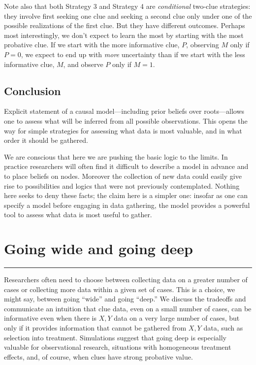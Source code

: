 \documentclass[
  12pt,
]{book}
\begin{document}
Note also that both Strategy 3 and Strategy 4 are \emph{conditional} two-clue strategies: they involve first seeking one clue and seeking a second clue only under one of the possible realizations of the first clue. But they have different outcomes. Perhaps most interestingly, we don't expect to learn the most by starting with the most probative clue. If we start with the more informative clue, \(P\), observing \(M\) only if \(P=0\), we expect to end up with \emph{more} uncertainty than if we start with the less informative clue, \(M\), and observe \(P\) only if \(M=1\).

\hypertarget{conclusion-2}{%
\section{Conclusion}\label{conclusion-2}}

Explicit statement of a causal model---including prior beliefs over roots---allows one to assess what will be inferred from all possible observations. This opens the way for simple strategies for assessing what data is most valuable, and in what order it should be gathered.

We are conscious that here we are pushing the basic logic to the limits. In practice researchers will often find it difficult to describe a model in advance and to place beliefs on nodes. Moreover the collection of new data could easily give rise to possibilities and logics that were not previously contemplated. Nothing here seeks to deny these facts; the claim here is a simpler one: insofar as one can specify a model before engaging in data gathering, the model provides a powerful tool to assess what data is most useful to gather.

\hypertarget{wide}{%
\chapter{Going wide and going deep}\label{wide}}

\begin{center}\rule{0.5\linewidth}{0.5pt}\end{center}

Researchers often need to choose between collecting data on a greater number of cases or collecting more data within a given set of cases. This is a choice, we might say, between going ``wide'' and going ``deep.'' We discuss the tradeoffs and communicate an intuition that clue data, even on a small number of cases, can be informative even when there is \(X, Y\) data on a very large number of cases, but only if it provides information that cannot be gathered from \(X,Y\) data, such as selection into treatment. Simulations suggest that going deep is especially valuable for observational research, situations with homogeneous treatment effects, and, of course, when clues have strong probative value.
\end{document}
